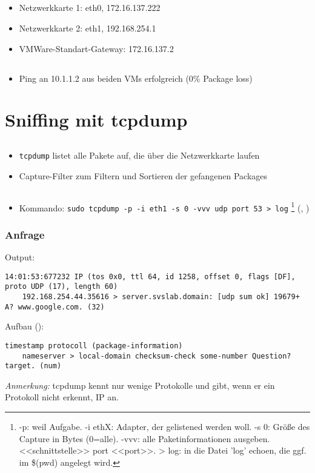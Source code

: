 \documentclass[twoside]{article}
\newcommand{\ttt}[1]{%
	\texttt{#1}%
}
\begin{document}
\subsection{}
\begin{itemize}
	\item Netzwerkkarte 1: eth0, 172.16.137.222
	\item Netzwerkkarte 2: eth1, 192.168.254.1
	\item VMWare-Standart-Gateway: 172.16.137.2
\end{itemize}
\subsection{}
\begin{itemize}
	\item Ping an 10.1.1.2 aus beiden VMs erfolgreich (0\% Package loss)
\end{itemize}

\section{Sniffing mit tcpdump}
\subsection{}
\begin{itemize}
	\item \ttt{tcpdump} listet alle Pakete auf, die über die Netzwerkkarte laufen
	\item Capture-Filter zum Filtern und Sortieren der gefangenen Packages
\end{itemize}
\subsection{}
\begin{itemize}
	\item Kommando: \ttt{sudo tcpdump -p -i eth1 -s 0 -vvv udp port 53 > log}\footnote{-p: weil Aufgabe. -i ethX: Adapter, der gelistened werden woll. -s 0: Größe des Capture in Bytes (0=alle). -vvv: alle Paketinformationen ausgeben. <<schnittstelle>> port <<port>>. > log: in die Datei 'log' echoen, die ggf. im \$(pwd) angelegt wird.} (\cite{uwtcpdump}, \cite{daniel})
\end{itemize}
\subsubsection{Anfrage}
Output:
\begin{lstlisting}
14:01:53:677232 IP (tos 0x0, ttl 64, id 1258, offset 0, flags [DF], proto UDP (17), length 60)
    192.168.254.44.35616 > server.svslab.domain: [udp sum ok] 19679+ A? www.google.com. (32)
\end{lstlisting}
Aufbau (\cite{alex}):
\begin{lstlisting}
timestamp protocoll (package-information)
	nameserver > local-domain checksum-check some-number Question? target. (num)
\end{lstlisting}
\textit{Anmerkung:} tcpdump kennt nur wenige Protokolle und gibt, wenn er ein Protokoll nicht erkennt, IP an.
\end{document}
